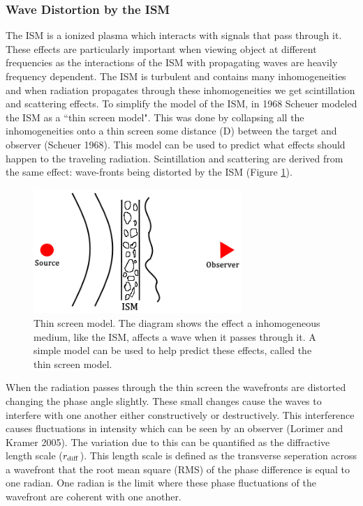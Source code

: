 \documentclass[a4paper, 10pt]{article}
\begin{document}
\subsubsection{Wave Distortion by the ISM}\label{ISM}
The ISM is a ionized plasma which interacts with signals that pass through it. These effects are particularly important when viewing object at different frequencies as the interactions of the ISM with propagating waves are heavily frequency dependent. The ISM is turbulent and contains many inhomogeneities and when radiation propagates through these inhomogeneities we get scintillation and scattering effects.
To simplify the model of the ISM, in 1968 Scheuer modeled the ISM as a ``thin screen model". This was done by collapsing all the inhomogeneities onto a thin screen some distance (D) between the target and observer (Scheuer 1968). This model can be used to predict what effects should happen to the traveling radiation. Scintillation and scattering are derived from the same effect: wave-fronts being distorted by the ISM (Figure \ref{path}).
\begin{figure}[H]
    \centering 
    \includegraphics[width=0.7\textwidth]{thinscreen}
    \caption{Thin screen model. The diagram shows the effect a inhomogeneous medium, like the ISM, affects a wave when it passes through it. A simple model can be used to help predict these effects, called the thin screen model.}
    \label{path}
\end{figure}

When the radiation passes through the thin screen the wavefronts are distorted changing the phase angle slightly. These small changes cause the waves to interfere with one another either constructively or destructively. This interference causes fluctuations in intensity which can be seen by an observer (Lorimer and Kramer 2005). The variation due to this can be quantified as the diffractive length scale ($r_{\ce{diff}}$). This length scale is defined as the transverse seperation across a wavefront that the root mean square (RMS) of the phase difference is equal to one radian. One radian is the limit where these phase fluctuations of the wavefront are coherent with one another.
\end{document}
